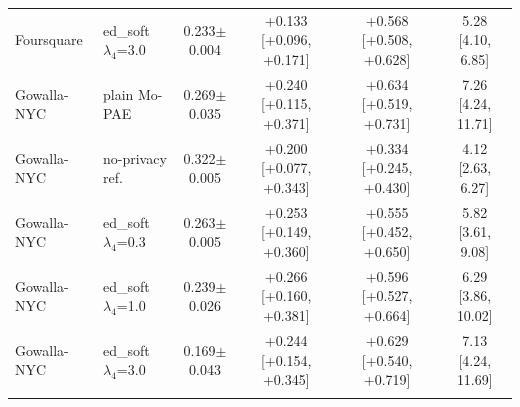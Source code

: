\begin{table}[t]
\begin{tabular}{@{}llcccc@{}}
Foursquare & ed\_soft $\lambda_4$=3.0 & 0.233$\pm$0.004 & +0.133 [+0.096, +0.171] & +0.568 [+0.508, +0.628] & 5.28 [4.10, 6.85] \\
\addlinespace
Gowalla-NYC & plain Mo-PAE & 0.269$\pm$0.035 & +0.240 [+0.115, +0.371] & +0.634 [+0.519, +0.731] & 7.26 [4.24, 11.71] \\
Gowalla-NYC & no-privacy ref. & 0.322$\pm$0.005 & +0.200 [+0.077, +0.343] & +0.334 [+0.245, +0.430] & 4.12 [2.63, 6.27] \\
Gowalla-NYC & ed\_soft $\lambda_4$=0.3 & 0.263$\pm$0.005 & +0.253 [+0.149, +0.360] & +0.555 [+0.452, +0.650] & 5.82 [3.61, 9.08] \\
Gowalla-NYC & ed\_soft $\lambda_4$=1.0 & 0.239$\pm$0.026 & +0.266 [+0.160, +0.381] & +0.596 [+0.527, +0.664] & 6.29 [3.86, 10.02] \\
Gowalla-NYC & ed\_soft $\lambda_4$=3.0 & 0.169$\pm$0.043 & +0.244 [+0.154, +0.345] & +0.629 [+0.540, +0.719] & 7.13 [4.24, 11.69] \\
\addlinespace
\bottomrule
\end{tabular}
\end{table}
